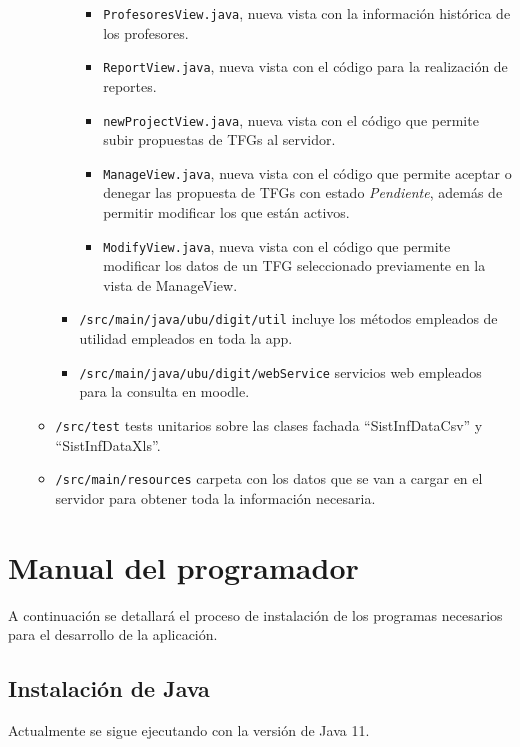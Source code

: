 \begin{itemize}
\begin{itemize}
\begin{itemize}
					\begin{itemize}
						\item \texttt{ProfesoresView.java}, nueva vista con la información histórica de los profesores.
						\item \texttt{ReportView.java}, nueva vista con el código para la realización de reportes.
						\item \texttt{newProjectView.java}, nueva vista con el código que permite subir propuestas de TFGs al servidor.
						\item \texttt{ManageView.java}, nueva vista con el código que permite aceptar o denegar las propuesta de TFGs con estado \emph{Pendiente}, además de permitir modificar los que están activos.
						\item \texttt{ModifyView.java}, nueva vista con el código que permite modificar los datos de un TFG seleccionado previamente en la vista de ManageView.
					\end{itemize}
				\item \texttt{/src/main/java/ubu/digit/util} incluye los métodos empleados de utilidad empleados en toda la app. 
				\item \texttt{/src/main/java/ubu/digit/webService} servicios web empleados para la consulta en moodle.
			\end{itemize}
			
			\item \texttt{/src/test} tests unitarios sobre las clases fachada “SistInfDataCsv” y “SistInfDataXls”.
			
			\item \texttt{/src/main/resources} carpeta con los datos que se van a cargar en el servidor para obtener toda la información necesaria.
		\end{itemize}
	
\end{itemize}
			
\section{Manual del programador}

A continuación se detallará el proceso de instalación de los programas
necesarios para el desarrollo de la aplicación.

\subsection{Instalación de Java}

Actualmente se sigue ejecutando con la versión de Java 11.

